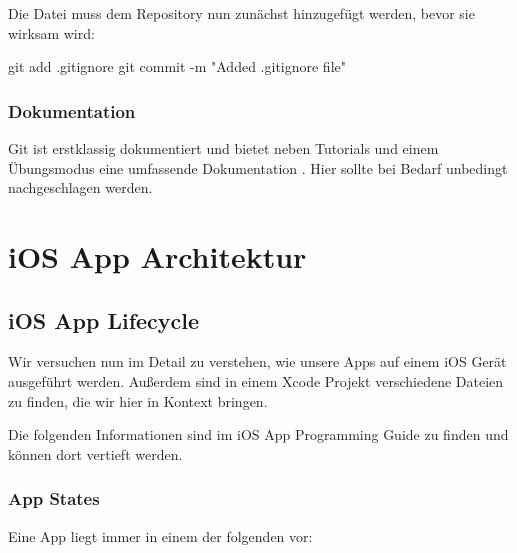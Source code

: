 \documentclass[parskip=half, final]{scrreprt}
\begin{document}
Die  Datei muss dem Repository nun zunächst hinzugefügt werden, bevor sie wirksam wird:

\begin{shlst}
git add .gitignore
git commit -m "Added .gitignore file"
\end{shlst}

\subsection{Dokumentation}\label{sec:git_doku}

Git  ist erstklassig dokumentiert und bietet neben Tutorials und einem Übungsmodus  eine umfassende Dokumentation . Hier sollte bei Bedarf unbedingt nachgeschlagen werden.



\chapter{iOS App Architektur}


\section{iOS App Lifecycle}

Wir versuchen nun im Detail zu verstehen, wie unsere Apps auf einem iOS Gerät ausgeführt werden. Außerdem sind in einem Xcode Projekt verschiedene Dateien zu finden, die wir hier in Kontext bringen.

Die folgenden Informationen sind im iOS App Programming Guide  zu finden und können dort vertieft werden.

\subsection{App States}\label{sec:app_states}

Eine App liegt immer in einem der folgenden  vor:
\end{document}
